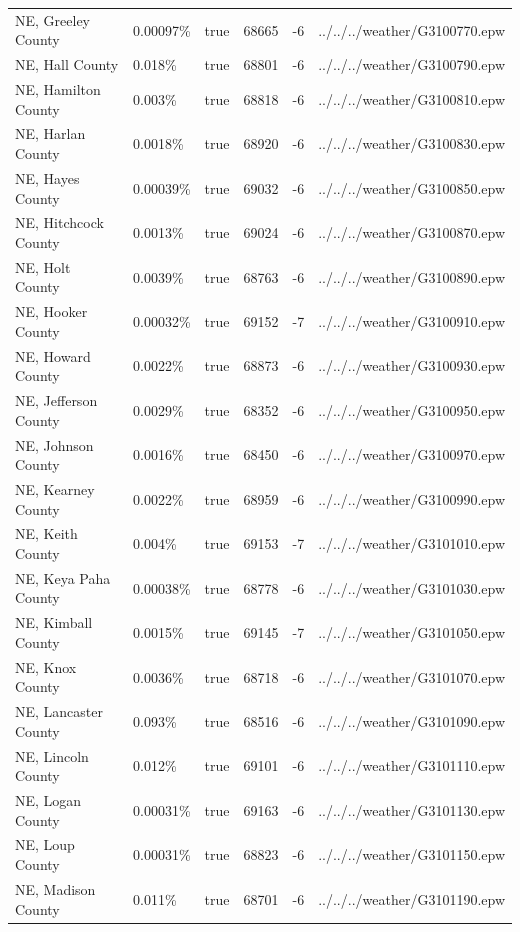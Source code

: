 \begin{longtable}[]{@{}llllll@{}}
NE, Greeley County & 0.00097\% & true & 68665 & -6 &
../../../weather/G3100770.epw \\
NE, Hall County & 0.018\% & true & 68801 & -6 &
../../../weather/G3100790.epw \\
NE, Hamilton County & 0.003\% & true & 68818 & -6 &
../../../weather/G3100810.epw \\
NE, Harlan County & 0.0018\% & true & 68920 & -6 &
../../../weather/G3100830.epw \\
NE, Hayes County & 0.00039\% & true & 69032 & -6 &
../../../weather/G3100850.epw \\
NE, Hitchcock County & 0.0013\% & true & 69024 & -6 &
../../../weather/G3100870.epw \\
NE, Holt County & 0.0039\% & true & 68763 & -6 &
../../../weather/G3100890.epw \\
NE, Hooker County & 0.00032\% & true & 69152 & -7 &
../../../weather/G3100910.epw \\
NE, Howard County & 0.0022\% & true & 68873 & -6 &
../../../weather/G3100930.epw \\
NE, Jefferson County & 0.0029\% & true & 68352 & -6 &
../../../weather/G3100950.epw \\
NE, Johnson County & 0.0016\% & true & 68450 & -6 &
../../../weather/G3100970.epw \\
NE, Kearney County & 0.0022\% & true & 68959 & -6 &
../../../weather/G3100990.epw \\
NE, Keith County & 0.004\% & true & 69153 & -7 &
../../../weather/G3101010.epw \\
NE, Keya Paha County & 0.00038\% & true & 68778 & -6 &
../../../weather/G3101030.epw \\
NE, Kimball County & 0.0015\% & true & 69145 & -7 &
../../../weather/G3101050.epw \\
NE, Knox County & 0.0036\% & true & 68718 & -6 &
../../../weather/G3101070.epw \\
NE, Lancaster County & 0.093\% & true & 68516 & -6 &
../../../weather/G3101090.epw \\
NE, Lincoln County & 0.012\% & true & 69101 & -6 &
../../../weather/G3101110.epw \\
NE, Logan County & 0.00031\% & true & 69163 & -6 &
../../../weather/G3101130.epw \\
NE, Loup County & 0.00031\% & true & 68823 & -6 &
../../../weather/G3101150.epw \\
NE, Madison County & 0.011\% & true & 68701 & -6 &
../../../weather/G3101190.epw \\

\end{longtable}
